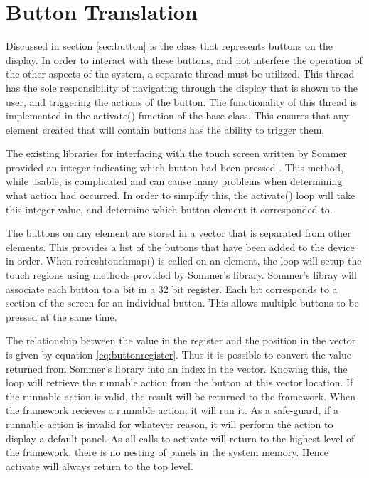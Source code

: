\section{Button Translation}
\label{sec:button_thread}

Discussed in section \ref{sec:button} is the class that represents buttons on the display. In order to interact with these buttons, and not interfere the operation of the other aspects of the system, a separate thread must be utilized. This thread has the sole responsibility of navigating through the display that is shown to the user, and triggering the actions of the button. The functionality of this thread is implemented in the activate() function of the base class. This ensures that any element created that will contain buttons has the ability to trigger them.

The existing libraries for interfacing with the touch screen written by Sommer provided an integer indicating which button had been pressed \cite{thesis_sommer}. This method, while usable, is complicated and can cause many problems when determining what action had occurred. In order to simplify this, the activate() loop will take this integer value, and determine which button element it corresponded to. 

The buttons on any element are stored in a vector that is separated from other elements. This provides a list of the buttons that have been added to the device in order. When refreshtouchmap() is called on an element, the loop will setup the touch regions using methods provided by Sommer's library. Sommer's libray will associate each button to a bit in a 32 bit register. Each bit corresponds to a section of the screen for an individual button. This allows multiple buttons to be pressed at the same time.

The relationship between the value in the register and the position in the vector is given by equation \ref{eq:buttonregister}. Thus it is possible to convert the value returned from Sommer's library into an index in the vector. Knowing this, the loop will retrieve the runnable action from the button at this vector location. If the runnable action is valid, the result will be returned to the framework. When the framework recieves a runnable action, it will run it. As a safe-guard, if a runnable action is invalid for whatever reason, it will perform the action to display a default panel. As all calls to activate will return to the highest level of the framework, there is no nesting of panels in the system memory. Hence activate will always return to the top level.

